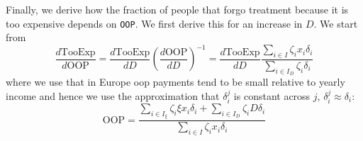 \documentclass[a4paper,12pt]{article}
\begin{document}
Finally, we derive how the fraction of people that forgo treatment because it is too expensive depends on \texttt{OOP}. We first derive this for an increase in \(D\). We start from
\begin{equation}
\label{eq:TooExp_OOP}
\frac{d \text{TooExp}}{d \text{OOP}} = \frac{d \text{TooExp}}{dD} \left( \frac{d \text{OOP}}{d D}
  \right)^{-1} = \frac{d \text{TooExp}}{dD} \frac{\sum_{i \in I} \zeta_i x_i \delta_i}{\sum_{i \in I_D} \zeta_i \delta_i}
\end{equation}
where we use that in Europe oop payments tend to be small relative to yearly income and hence we use the approximation that \(\delta^j_i\) is constant across \(j\), \(\delta^{j}_i \approx \delta_{i}\):
\begin{equation}
\label{eq:OOP2_app}
\text{OOP} = \frac{\sum_{i \in I_{\xi}} \zeta_i \xi x_i \delta_i+ \sum_{i \in I_D} \zeta_i D \delta_i}{\sum_{i \in I} \zeta_i x_i \delta_i}
\end{equation}
\end{document}
